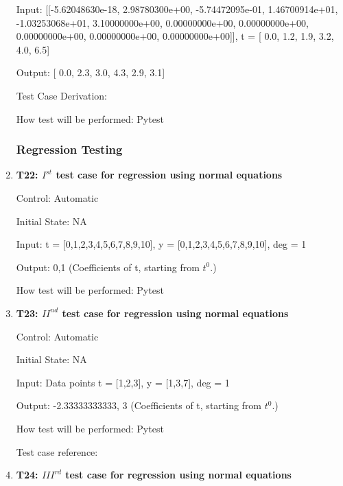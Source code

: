 \documentclass[12pt, titlepage]{article}
\begin{document}
\begin{enumerate}
Input: [[-5.62048630e-18, 2.98780300e+00, -5.74472095e-01,  1.46700914e+01,
-1.03253068e+01,  3.10000000e+00,  0.00000000e+00,  0.00000000e+00,
0.00000000e+00,  0.00000000e+00,  0.00000000e+00]], t = [ 0.0, 1.2,  1.9,  
3.2,  4.0,  6.5] 

Output: [ 0.0,  2.3,  3.0,  4.3,  2.9,  3.1]

Test Case Derivation: \cite{BSpline}

How test will be performed: Pytest







\subsubsection{Regression Testing}\label{ResgressionTesting}



\item{\textbf{T22: $I^{st}$ test case for regression using normal equations} \\}

Control: Automatic

Initial State: NA

Input: t = [0,1,2,3,4,5,6,7,8,9,10], y = [0,1,2,3,4,5,6,7,8,9,10], deg = 1 

Output: 0,1 (Coefficients of t, starting from $t^{0}$.)

How test will be performed: Pytest\\


\item{\textbf{T23: ${II}^{nd}$ test case for regression using normal 
equations}\\}

Control: Automatic

Initial State: NA

Input: Data points t = [1,2,3], y = [1,3,7], deg = 1

Output: -2.33333333333, 3 (Coefficients of t, starting from $t^{0}$.)

How test will be performed: Pytest

Test case reference: ~\cite{RegNormal}\\


\item{\textbf{T24: ${III}^{rd}$ test case for regression using normal equations 
}\\}


\end{enumerate}
\end{document}
